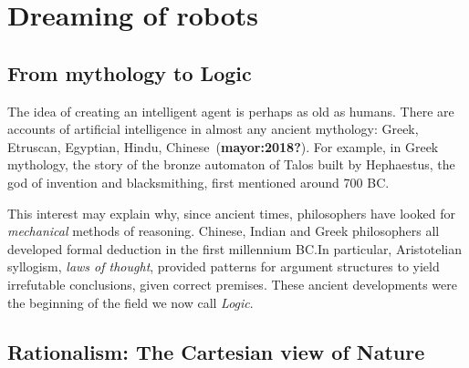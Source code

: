 \documentclass[
  letterpaper,
  DIV=11,
  numbers=noendperiod,
  oneside]{scrreprt}
\begin{document}
\hypertarget{dreaming-of-robots}{%
\section{Dreaming of robots}\label{dreaming-of-robots}}

\hypertarget{from-mythology-to-logic}{%
\subsection{From mythology to Logic}\label{from-mythology-to-logic}}

The idea of creating an intelligent agent is perhaps as old as humans.
There are accounts of artificial intelligence in almost any ancient
mythology: Greek, Etruscan, Egyptian, Hindu,
Chinese~(\textbf{mayor:2018?}). For example, in Greek mythology, the
story of the bronze automaton of Talos built by Hephaestus, the god of
invention and blacksmithing, first mentioned around 700 BC.

This interest may explain why, since ancient times, philosophers have
looked for \emph{mechanical} methods of reasoning. Chinese, Indian and
Greek philosophers all developed formal deduction in the first
millennium BC.In particular, Aristotelian syllogism, \emph{laws of
thought}, provided patterns for argument structures to yield irrefutable
conclusions, given correct premises. These ancient developments were the
beginning of the field we now call \emph{Logic}.

\hypertarget{sec-rationalism}{%
\subsection{Rationalism: The Cartesian view of
Nature}\label{sec-rationalism}}
\end{document}
